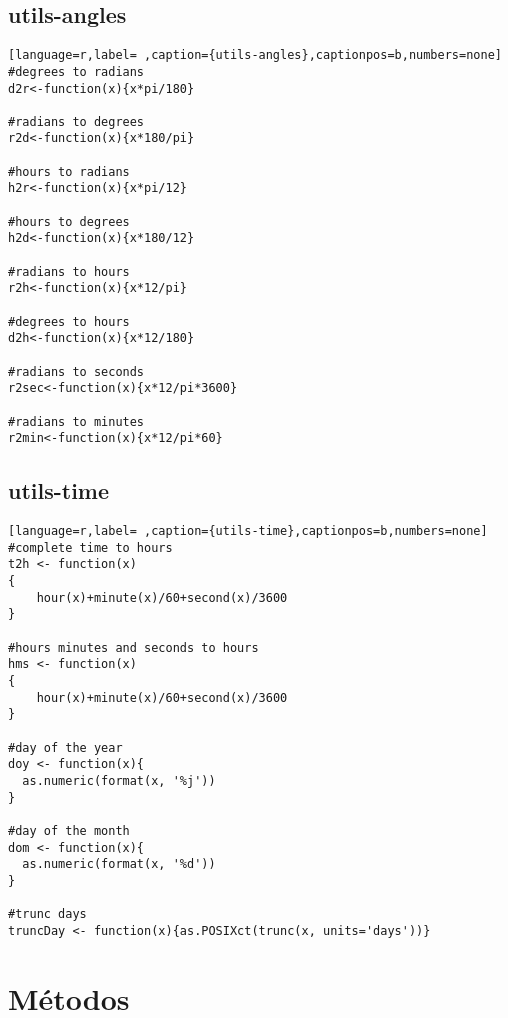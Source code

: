 \subsection{utils-angles}
\label{sec:orgfd13a77}
\label{subsec:utils-angles}
\begin{lstlisting}[language=r,label= ,caption={utils-angles},captionpos=b,numbers=none]
#degrees to radians
d2r<-function(x){x*pi/180}

#radians to degrees
r2d<-function(x){x*180/pi}

#hours to radians
h2r<-function(x){x*pi/12}

#hours to degrees
h2d<-function(x){x*180/12}

#radians to hours
r2h<-function(x){x*12/pi}

#degrees to hours
d2h<-function(x){x*12/180}

#radians to seconds
r2sec<-function(x){x*12/pi*3600}

#radians to minutes
r2min<-function(x){x*12/pi*60}
\end{lstlisting}
\subsection{utils-time}
\label{sec:orge6c26d6}
\label{subsec:utils-time}
\begin{lstlisting}[language=r,label= ,caption={utils-time},captionpos=b,numbers=none]
#complete time to hours
t2h <- function(x)
{
    hour(x)+minute(x)/60+second(x)/3600
}

#hours minutes and seconds to hours
hms <- function(x)
{
    hour(x)+minute(x)/60+second(x)/3600
}

#day of the year
doy <- function(x){
  as.numeric(format(x, '%j'))
}

#day of the month
dom <- function(x){
  as.numeric(format(x, '%d'))
}

#trunc days
truncDay <- function(x){as.POSIXct(trunc(x, units='days'))}
\end{lstlisting}
\section{Métodos}
\label{sec:org0d6997a}
\label{sec:metodos}
